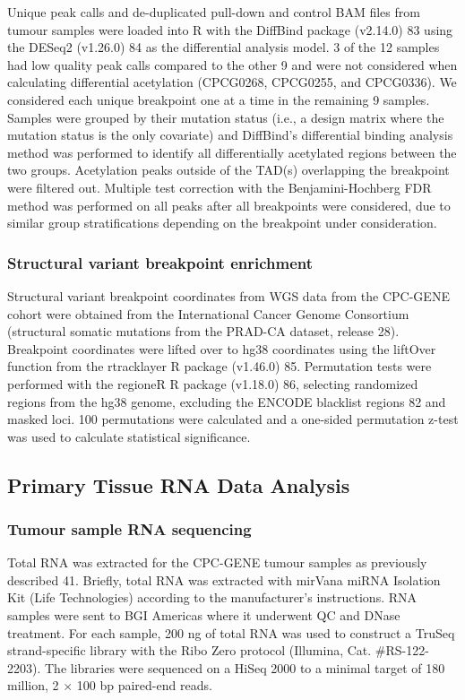 Unique peak calls and de-duplicated pull-down and control BAM files from tumour samples were loaded into R with the DiffBind package (v2.14.0) 83 using the DESeq2 (v1.26.0) 84 as the differential analysis model.
3 of the 12 samples had low quality peak calls compared to the other 9 and were not considered when calculating differential acetylation (CPCG0268, CPCG0255, and CPCG0336).
We considered each unique breakpoint one at a time in the remaining 9 samples.
Samples were grouped by their mutation status (i.e., a design matrix where the mutation status is the only covariate) and DiffBind's differential binding analysis method was performed to identify all differentially acetylated regions between the two groups.
Acetylation peaks outside of the TAD(s) overlapping the breakpoint were filtered out.
Multiple test correction with the Benjamini-Hochberg FDR method was performed on all peaks after all breakpoints were considered, due to similar group stratifications depending on the breakpoint under consideration.

\subsubsection{Structural variant breakpoint enrichment}

Structural variant breakpoint coordinates from WGS data from the CPC-GENE cohort were obtained from the International Cancer Genome Consortium (structural somatic mutations from the PRAD-CA dataset, release 28).
Breakpoint coordinates were lifted over to hg38 coordinates using the liftOver function from the rtracklayer R package (v1.46.0) 85.
Permutation tests were performed with the regioneR R package (v1.18.0) 86, selecting randomized regions from the hg38 genome, excluding the ENCODE blacklist regions 82 and masked loci.
100 permutations were calculated and a one-sided permutation z-test was used to calculate statistical significance.

\subsection{Primary Tissue RNA Data Analysis}

\subsubsection{Tumour sample RNA sequencing}

Total RNA was extracted for the CPC-GENE tumour samples as previously described 41.
Briefly, total RNA was extracted with mirVana miRNA Isolation Kit (Life Technologies) according to the manufacturer's instructions.
RNA samples were sent to BGI Americas where it underwent QC and DNase treatment.
For each sample, 200 ng of total RNA was used to construct a TruSeq strand-specific library with the Ribo Zero protocol (Illumina, Cat.
#RS-122-2203).
The libraries were sequenced on a HiSeq 2000 to a minimal target of 180 million, 2 $\times$ 100 bp paired-end reads.

